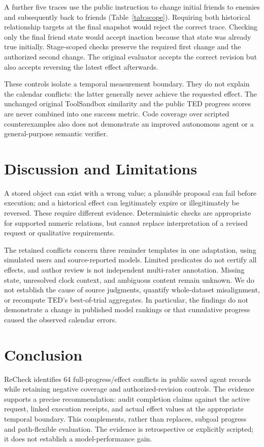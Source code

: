 \documentclass[10pt,letterpaper]{article}
\begin{document}
A further five traces use the public instruction to change initial friends to enemies and subsequently back to friends (Table~\ref{tab:scope}). Requiring both historical relationship targets at the final snapshot would reject the correct trace. Checking only the final friend state would accept inaction because that state was already true initially. Stage-scoped checks preserve the required first change and the authorized second change. The original evaluator accepts the correct revision but also accepts reversing the latest effect afterwards.



These controls isolate a temporal measurement boundary. They do not explain the calendar conflicts: the latter generally never achieve the requested effect. The unchanged original ToolSandbox similarity and the public TED progress scores are never combined into one success metric. Code coverage over scripted counterexamples also does not demonstrate an improved autonomous agent or a general-purpose semantic verifier.

\section{Discussion and Limitations}
\label{sec:limits}
A stored object can exist with a wrong value; a plausible proposal can fail before execution; and a historical effect can legitimately expire or illegitimately be reversed. These require different evidence. Deterministic checks are appropriate for supported numeric relations, but cannot replace interpretation of a revised request or qualitative requirements.

The retained conflicts concern three reminder templates in one adaptation, using simulated users and source-reported models. Limited predicates do not certify all effects, and author review is not independent multi-rater annotation. Missing state, unresolved clock context, and ambiguous content remain unknown. We do not establish the cause of source judgments, quantify whole-dataset misalignment, or recompute TED's best-of-trial aggregates. In particular, the findings do not demonstrate a change in published model rankings or that cumulative progress caused the observed calendar errors.

\section{Conclusion}
ReCheck identifies 64 full-progress/effect conflicts in public saved agent records while retaining negative coverage and authorized-revision controls. The evidence supports a precise recommendation: audit completion claims against the active request, linked execution receipts, and actual effect values at the appropriate temporal boundary. This complements, rather than replaces, subgoal progress and path-flexible evaluation. The evidence is retrospective or explicitly scripted; it does not establish a model-performance gain.


\end{document}
